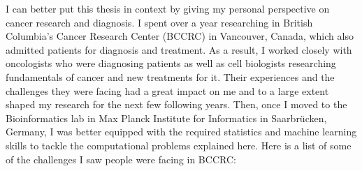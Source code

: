 I can better put this thesis in context by giving my personal perspective on
cancer research and diagnosis. I spent over a year researching in British
Columbia's Cancer Research Center (BCCRC) in Vancouver, Canada, which also
admitted patients for diagnosis and treatment. As a result, I worked closely
with oncologists who were diagnosing patients as well as cell biologists
researching fundamentals of cancer and new treatments for it. Their experiences
and the challenges they were facing had a great impact on me and to a large
extent shaped my research for the next few following years. Then, once I moved
to the Bioinformatics lab in Max Planck Institute for Informatics in
Saarbr\"ucken, Germany, I was better equipped with the required statistics and
machine learning skills to tackle the computational problems explained here.
Here is a list of some of the challenges I saw people were facing in BCCRC:

